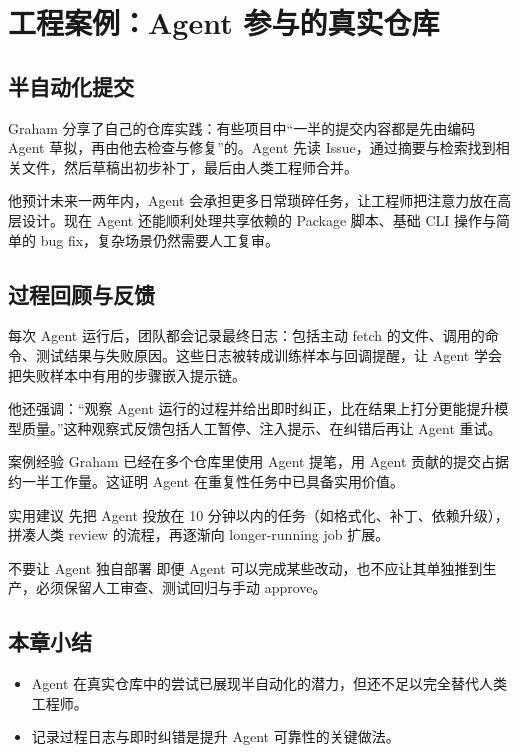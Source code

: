 \section{工程案例：Agent 参与的真实仓库}
\subsection{半自动化提交}
Graham 分享了自己的仓库实践：有些项目中“一半的提交内容都是先由编码 Agent 草拟，再由他去检查与修复”的。Agent 先读 Issue，通过摘要与检索找到相关文件，然后草稿出初步补丁，最后由人类工程师合并。

他预计未来一两年内，Agent 会承担更多日常琐碎任务，让工程师把注意力放在高层设计。现在 Agent 还能顺利处理共享依赖的 Package 脚本、基础 CLI 操作与简单的 bug fix，复杂场景仍然需要人工复审。

\subsection{过程回顾与反馈}
每次 Agent 运行后，团队都会记录最终日志：包括主动 fetch 的文件、调用的命令、测试结果与失败原因。这些日志被转成训练样本与回调提醒，让 Agent 学会把失败样本中有用的步骤嵌入提示链。

他还强调：“观察 Agent 运行的过程并给出即时纠正，比在结果上打分更能提升模型质量。”这种观察式反馈包括人工暂停、注入提示、在纠错后再让 Agent 重试。

\begin{knowledgebox}{案例经验}
Graham 已经在多个仓库里使用 Agent 提笔，用 Agent 贡献的提交占据约一半工作量。这证明 Agent 在重复性任务中已具备实用价值。
\end{knowledgebox}

\begin{importantbox}{实用建议}
先把 Agent 投放在 10 分钟以内的任务（如格式化、补丁、依赖升级），拼凑人类 review 的流程，再逐渐向 longer-running job 扩展。
\end{importantbox}

\begin{warningbox}{不要让 Agent 独自部署}
即便 Agent 可以完成某些改动，也不应让其单独推到生产，必须保留人工审查、测试回归与手动 approve。
\end{warningbox}

\subsection{本章小结}
\begin{itemize}
    \item Agent 在真实仓库中的尝试已展现半自动化的潜力，但还不足以完全替代人类工程师。
    \item 记录过程日志与即时纠错是提升 Agent 可靠性的关键做法。
\end{itemize}

